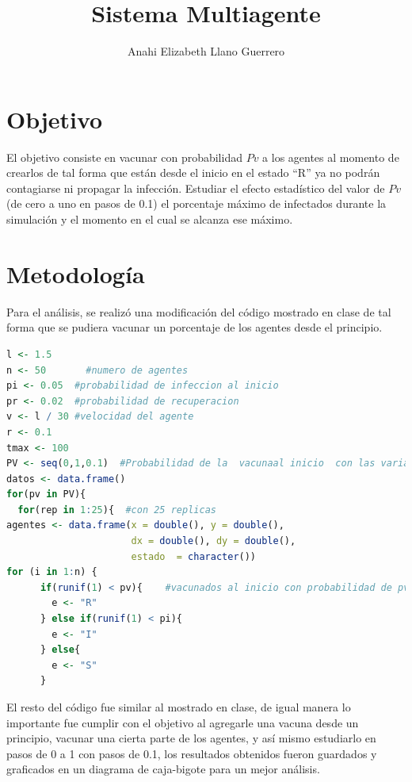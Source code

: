 \documentclass{article}
\begin{document}
\title{\textbf{Sistema Multiagente}}
\author{Anahi Elizabeth Llano Guerrero}

\maketitle

\section{Objetivo}\label{obj}

El objetivo \cite{elisa} consiste en vacunar con probabilidad $Pv$ a los agentes al momento de crearlos de tal forma que est\'an desde el inicio en el estado ``R''  ya no podr\'an contagiarse ni propagar la infecci\'on. Estudiar el efecto estad\'istico del valor de $Pv$  (de cero a uno en pasos de 0.1) el porcentaje m\'aximo de infectados durante la simulaci\'on y el momento en el cual se alcanza ese m\'aximo.

\section{Metodolog\'{i}a}\label{met}

Para el an\'alisis, se realiz\'o una modificaci\'on del c\'odigo \citet{elisa} mostrado en clase de tal forma que se pudiera vacunar un porcentaje de los agentes desde el principio.


\begin{lstlisting}[language=R]
l <- 1.5     
n <- 50       #numero de agentes
pi <- 0.05  #probabilidad de infeccion al inicio
pr <- 0.02  #probabilidad de recuperacion
v <- l / 30 #velocidad del agente
r <- 0.1 
tmax <- 100 
PV <- seq(0,1,0.1)  #Probabilidad de la  vacunaal inicio  con las variaciones
datos <- data.frame()
for(pv in PV){   
  for(rep in 1:25){  #con 25 replicas
agentes <- data.frame(x = double(), y = double(),
                      dx = double(), dy = double(),
                      estado  = character())
for (i in 1:n) {                                                       
      if(runif(1) < pv){    #vacunados al inicio con probabilidad de pv
        e <- "R"
      } else if(runif(1) < pi){
        e <- "I"
      } else{
        e <- "S"
      }
\end{lstlisting}
  

El resto del c\'odigo \citep{ana} fue similar al mostrado en clase, de igual manera lo importante fue cumplir con el objetivo al agregarle una vacuna desde un principio, vacunar una cierta parte de los agentes, y as\'i mismo estudiarlo en pasos de 0 a 1 con pasos de 0.1, los resultados obtenidos fueron guardados y graficados en un diagrama de caja-bigote para un mejor an\'alisis.
\end{document}
